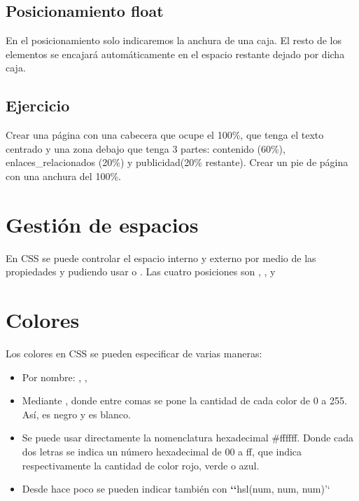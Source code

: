 \documentclass[letterpaper,10pt,spanish]{sphinxmanual}
\begin{document}
\subsection{Posicionamiento float}
\label{tema3:posicionamiento-float}
En el posicionamiento  solo indicaremos la anchura de una caja. El resto de los elementos se encajará automáticamente en el espacio restante dejado por dicha caja.


\subsection{Ejercicio}
\label{tema3:id4}
Crear una página con una cabecera que ocupe el 100\%, que tenga el texto centrado y una zona debajo que tenga 3 partes: contenido (60\%), enlaces\_relacionados (20\%) y publicidad(20\% restante). Crear un pie de página con una anchura del 100\%.


\section{Gestión de espacios}
\label{tema3:gestion-de-espacios}
En CSS se puede controlar el espacio interno y externo por medio de las propiedades  y  pudiendo usar  o . Las cuatro posiciones son , ,  y 


\section{Colores}
\label{tema3:colores}
Los colores en CSS se pueden especificar de varias maneras:
\begin{itemize}
\item {} 
Por nombre: , , 

\item {} 
Mediante , donde entre comas se pone la cantidad de cada color de 0 a 255. Así,  es negro y  es blanco.

\item {} 
Se puede usar directamente la nomenclatura hexadecimal \#ffffff. Donde cada dos letras se indica un número hexadecimal de 00 a ff, que indica respectivamente la cantidad de color rojo, verde o azul.

\item {} 
Desde hace poco se pueden indicar también con {\color{red}\bfseries{}{}`{}`}hsl(num, num, num)'`

\end{itemize}
\end{document}
